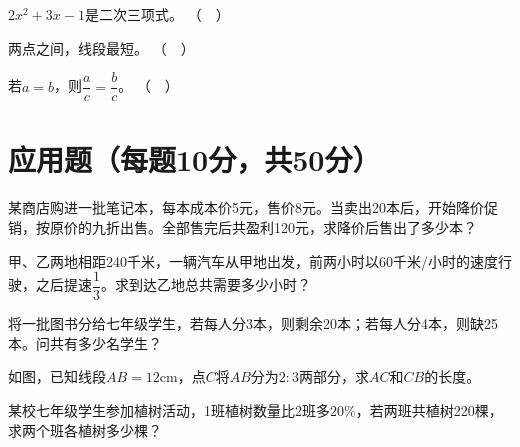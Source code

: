 \documentclass{exam}
\begin{document}
\begin{questions}
\question $2x^2 + 3x - 1$是二次三项式。 （ ）

\question 两点之间，线段最短。 （ ）

\question 若$a=b$，则$\dfrac{a}{c} = \dfrac{b}{c}$。 （ ）

\section{应用题（每题10分，共50分）}
\question 某商店购进一批笔记本，每本成本价5元，售价8元。当卖出20本后，开始降价促销，按原价的九折出售。全部售完后共盈利120元，求降价后售出了多少本？

\vspace{4cm}

\question 甲、乙两地相距240千米，一辆汽车从甲地出发，前两小时以60千米/小时的速度行驶，之后提速$\dfrac{1}{3}$。求到达乙地总共需要多少小时？

\vspace{4cm}

\question 将一批图书分给七年级学生，若每人分3本，则剩余20本；若每人分4本，则缺25本。问共有多少名学生？

\vspace{4cm}

\question 如图，已知线段$AB=12$cm，点$C$将$AB$分为$2:3$两部分，求$AC$和$CB$的长度。

\vspace{4cm}

\question 某校七年级学生参加植树活动，1班植树数量比2班多20\%，若两班共植树220棵，求两个班各植树多少棵？

\end{questions}
\end{document}
